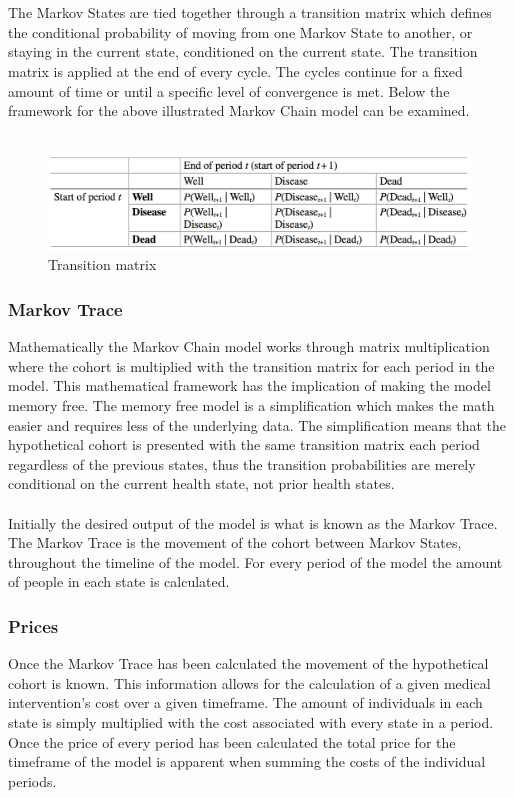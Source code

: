 \documentclass[a4paper,12pt]{article}
\begin{document}
\\\\
The Markov States are tied together through a transition matrix which defines the conditional probability of moving from one Markov State to another, or staying in the current state, conditioned on the current state. The transition matrix is applied at the end of every cycle. The cycles continue for a fixed amount of time or until a specific level of convergence is met. Below the framework for the above illustrated Markov Chain model can be examined.
\\\\
\begin{figure}[h]
	\centering
	\caption[]{Transition matrix}
	\label{fig:transition-matrix}
	\includegraphics[width=0.7\linewidth]{"Pictures/Transition matrix"}
\end{figure}




\subsubsection*{Markov Trace}
Mathematically the Markov Chain model works through matrix multiplication where the cohort is multiplied with the transition matrix for each period in the model. This mathematical framework has the implication of making the model memory free. The memory free model is a simplification which makes the math easier and requires less of the underlying data. The simplification means that the hypothetical cohort is presented with the same transition matrix each period regardless of the previous states, thus the transition probabilities are merely conditional on the current health state, not prior health states. 
\\\\
Initially the desired output of the model is what is known as the Markov Trace. The Markov Trace is the movement of the cohort between Markov States, throughout the timeline of the model. For every period of the model the amount of people in each state is calculated.

\subsubsection*{Prices}
Once the Markov Trace has been calculated the movement of the hypothetical cohort is known. This information allows for the calculation of a given medical intervention’s cost over a given timeframe. The amount of individuals in each state is simply multiplied with the cost associated with every state in a period. Once the price of every period has been calculated the total price for the timeframe of the model is apparent when summing the costs of the individual periods.
\end{document}
